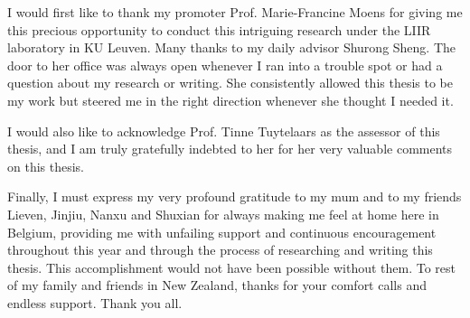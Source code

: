 \documentclass[master=mai,masteroption=bda]{kulemt}
\begin{document}
\begin{preface}
I would first like to thank my promoter Prof. Marie-Francine Moens for giving me this precious opportunity to conduct this intriguing research under the LIIR laboratory in KU Leuven. Many thanks to my daily advisor Shurong Sheng. The door to her office was always open whenever I ran into a trouble spot or had a question about my research or writing. She consistently allowed this thesis to be my work but steered me in the right direction whenever she thought I needed it.

I would also like to acknowledge Prof. Tinne Tuytelaars as the assessor of this thesis, and I am truly gratefully indebted to her for her very valuable comments on this thesis.

Finally, I must express my very profound gratitude to my mum and to my friends Lieven, Jinjiu, Nanxu and Shuxian for always making me feel at home here in Belgium, providing me with unfailing support and continuous encouragement throughout this year and through the process of researching and writing this thesis. This accomplishment would not have been possible without them. To rest of my family and friends in New Zealand, thanks for your comfort calls and endless support. Thank you all.

\end{preface}

\tableofcontents*

\end{document}
